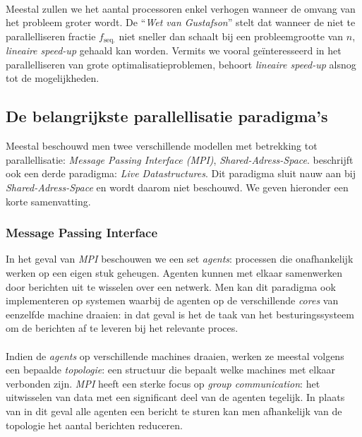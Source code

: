 \paragraph{}
Meestal zullen we het aantal processoren enkel verhogen wanneer de omvang van het probleem groter wordt. De ``\emph{Wet van Gustafson}''\cite{Gustafson:1988:RAL:42411.42415} stelt dat wanneer de niet te parallelliseren fractie $f_{\mbox{seq.}}$ niet sneller dan  schaalt bij een probleemgrootte van $n$, \emph{lineaire speed-up} gehaald kan worden. Vermits we vooral ge\"interesseerd in het parallelliseren van grote optimalisatieproblemen, behoort \emph{lineaire speed-up} alsnog tot de mogelijkheden.

\subsection{De belangrijkste parallellisatie paradigma's}

Meestal beschouwd men twee verschillende modellen met betrekking tot parallellisatie: \emph{Message Passing Interface (MPI)}, \emph{Shared-Adress-Space}. \cite{books/daglib/0066939} beschrijft ook een derde paradigma: \emph{Live Datastructures}. Dit paradigma sluit nauw aan bij \emph{Shared-Adress-Space} en wordt daarom niet beschouwd. We geven hieronder een korte samenvatting.\cite{books/bc/KumarGGK94,books/daglib/0066939}

\subsubsection{Message Passing Interface}

In het geval van \emph{MPI} beschouwen we een set \emph{agents}: processen die onafhankelijk werken op een eigen stuk geheugen. Agenten kunnen met elkaar samenwerken door berichten uit te wisselen over een netwerk. Men kan dit paradigma ook implementeren op systemen waarbij de agenten op de verschillende \emph{cores} van eenzelfde machine draaien: in dat geval is het de taak van het besturingssysteem om de berichten af te leveren bij het relevante proces.\cite{books/bc/KumarGGK94,books/daglib/0066939,books/daglib/0015079,mpi10}

\paragraph{}
Indien de \emph{agents} op verschillende machines draaien, werken ze meestal volgens een bepaalde \emph{topologie}: een structuur die bepaalt welke machines met elkaar verbonden zijn. \emph{MPI} heeft een sterke focus op \emph{group communication}: het uitwisselen van data met een significant deel van de agenten tegelijk. In plaats van in dit geval alle agenten een bericht te sturen kan men afhankelijk van de topologie het aantal berichten reduceren.\cite{books/bc/KumarGGK94}

